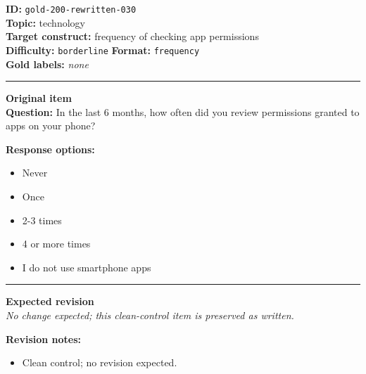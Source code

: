 \documentclass[10pt,a4paper]{article}
\newcommand{\sectionline}{\vspace{0.15em}\hrule\vspace{0.35em}}
\begin{document}
\begin{tcolorbox}[colframe=CleanGreen,colback=white,colbacktitle=CleanGreen!9,coltitle=black,title={Item 030\hfill Clean control}]
\textbf{ID:} \texttt{gold-200-rewritten-030}\\
\textbf{Topic:} technology\\
\textbf{Target construct:} frequency of checking app permissions\\
\textbf{Difficulty:} \texttt{borderline} \quad \textbf{Format:} \texttt{frequency}\\
\textbf{Gold labels:} \textit{none}\\
\sectionline
\textbf{Original item}\\
\textbf{Question:} In the last 6 months, how often did you review permissions granted to apps on your phone?
\par\textbf{Response options:}
\begin{itemize}
\item Never
\item Once
\item 2-3 times
\item 4 or more times
\item I do not use smartphone apps
\end{itemize}
\sectionline
\textbf{Expected revision}\\
\textit{No change expected; this clean-control item is preserved as written.}
\par\textbf{Revision notes:}
\begin{itemize}
\item Clean control; no revision expected.
\end{itemize}
\end{tcolorbox}
\end{document}
